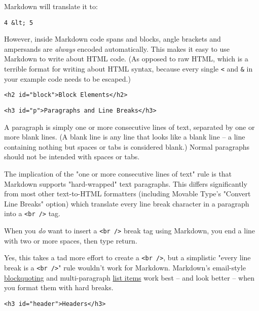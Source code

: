 Markdown will translate it to:

\begin{lstlisting}
4 &lt; 5
\end{lstlisting}




However, inside Markdown code spans and blocks, angle brackets and
ampersands are \emph{always} encoded automatically. This makes it easy to use
Markdown to write about HTML code. (As opposed to raw HTML, which is a
terrible format for writing about HTML syntax, because every single \texttt{<}
and \texttt{\&} in your example code needs to be escaped.)

\noindent\makebox[\linewidth]{\rule{\linewidth}{0.4pt}}


\begin{lstlisting}<h2 id="block">Block Elements</h2>\end{lstlisting}


\begin{lstlisting}<h3 id="p">Paragraphs and Line Breaks</h3>\end{lstlisting}




A paragraph is simply one or more consecutive lines of text, separated
by one or more blank lines. (A blank line is any line that looks like a
blank line -- a line containing nothing but spaces or tabs is considered
blank.) Normal paragraphs should not be intended with spaces or tabs.



The implication of the "one or more consecutive lines of text" rule is
that Markdown supports "hard-wrapped" text paragraphs. This differs
significantly from most other text-to-HTML formatters (including Movable
Type's "Convert Line Breaks" option) which translate every line break
character in a paragraph into a \texttt{<br />} tag.



When you \emph{do} want to insert a \texttt{<br />} break tag using Markdown, you
end a line with two or more spaces, then type return.



Yes, this takes a tad more effort to create a \texttt{<br />}, but a simplistic
"every line break is a \texttt{<br />}" rule wouldn't work for Markdown.
Markdown's email-style \href{\#blockquote}{blockquoting} and multi-paragraph \href{\#list}{list items}
work best -- and look better -- when you format them with hard breaks.

\begin{lstlisting}<h3 id="header">Headers</h3>\end{lstlisting}




